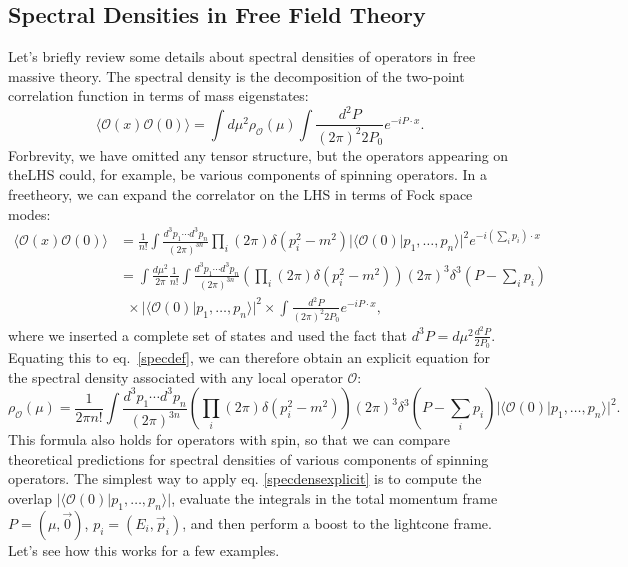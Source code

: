 \subsection{Spectral Densities in Free Field Theory} \label{sec:theoryspecdens} 
Let's briefly review some details about spectral densities of operators in free 
massive theory. The spectral density is the decomposition of the two-point 
correlation function in terms of mass eigenstates:
\begin{equation}
    \langle \mathcal{O}(x) \mathcal{O}(0) \rangle = \int d\mu^2 \rho_{\mathcal{O}}(\mu) \int \frac{d^2 P}{(2\pi)^2 2 P_0} e^{-i P \cdot x}.\label{specdef}
\end{equation}
Forbrevity, we have omitted any tensor structure, but the operators appearing on
theLHS could, for example, be various components of spinning operators. In a
freetheory, we can expand the correlator on the LHS in terms of Fock space
modes:
\begin{equation}
    \begin{aligned}
        \langle \mathcal{O}(x) \mathcal{O}(0) \rangle &= \frac{1}{n!} \int \frac{d^3 p_1 \dotsb d^3 p_n}{(2\pi)^{3n}} \prod_i (2\pi) \delta(p_i^2-m^2) | \langle \mathcal{O}(0) | p_1, \dots, p_n \rangle |^2 e^{-i \left(\sum_i p_i \right) \cdot x} \\
        &= \int \frac{d\mu^2}{2\pi} \frac{1}{n!} \int \frac{d^3 p_1 \dotsb d^3 p_n}{(2\pi)^{3n}} \left( \prod_i (2\pi) \delta(p_i^2-m^2)\right) (2\pi)^3 \delta^3 \left( P - \sum_i p_i \right) \\
        &\,\,\, \times | \langle \mathcal{O}(0) | p_1, \dots, p_n \rangle |^2 \times \int \frac{d^2 P}{(2\pi)^2 2P_0} e^{-i P \cdot x},
    \end{aligned}
\end{equation} 
where we inserted a complete set of states and used the fact that 
$d^3P = d\mu^2 \frac{d^2 P}{2P_0}$. Equating this to eq.~\eqref{specdef}, we can 
therefore obtain an explicit equation for the spectral density associated with 
any local operator $\mathcal{O}$: 
\begin{equation} 
    \rho_{\mathcal{O}}(\mu) = \frac{1}{2\pi n!} \int \frac{d^3 p_1 \dotsb d^3 p_n}{(2\pi)^{3n}} \left( \prod_i (2\pi) \delta(p_i^2 - m^2) \right) (2\pi)^3 \delta^3 ( P - \sum_i p_i ) | \langle \mathcal{O}(0) | p_1, \dots, p_n \rangle |^2. \label{specdensexplicit}
\end{equation} 
This formula also holds for operators with spin, so that we can compare 
theoretical predictions for spectral densities of various components of spinning 
operators. The simplest way to apply eq. \eqref{specdensexplicit} is to compute 
the overlap $| \langle \mathcal{O}(0) | p_1, \dots, p_n \rangle |$, evaluate the 
integrals in the total momentum frame 
$P = (\mu, \vec{0})$, $p_i = (E_i, \vec{p}_i)$, and then perform a boost to the 
lightcone frame. Let's see how this works for a few examples.

